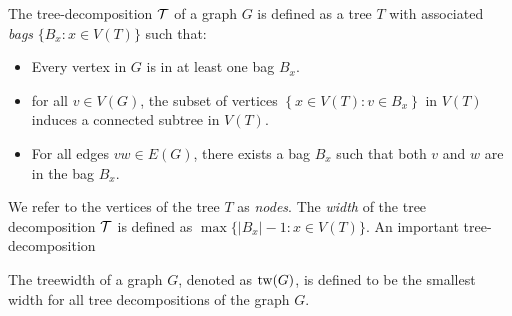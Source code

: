 \begin{definition}\label{def:tree-decomposition}
	The tree-decomposition \(\mathcal{T}\) of a graph \(G\) is defined as a tree \(T\) with associated \textit{bags} \(\lbrace B_x : x \in V(T) \rbrace\) such that:
	\begin{itemize}
		\item Every vertex in \(G\) is in at least one bag \(B_x\).
		\item for all \(v \in V(G)\), the subset of vertices \(\left\lbrace x \in V(T): v \in B_x \right\rbrace\) in \(V(T)\) induces a connected subtree in \(V(T)\).
		\item For all edges \(vw \in E(G)\), there exists a bag \(B_x\) such that both \(v\) and \(w\) are in the bag \(B_x\).
	\end{itemize}
\end{definition}
We refer to the vertices of the tree \(T\) as \textit{nodes}.
The \textit{width} of the tree decomposition \(\mathcal{T}\) is defined as \(\max \lbrace |B_x| - 1 : x \in V(T) \rbrace\). An important tree-decomposition

\begin{definition}\label{def:treewidth}
	The treewidth of a graph \(G\), denoted as \(\operatorname{tw}(G)\), is defined to be the smallest width for all tree decompositions of the graph \(G\).
\end{definition}


